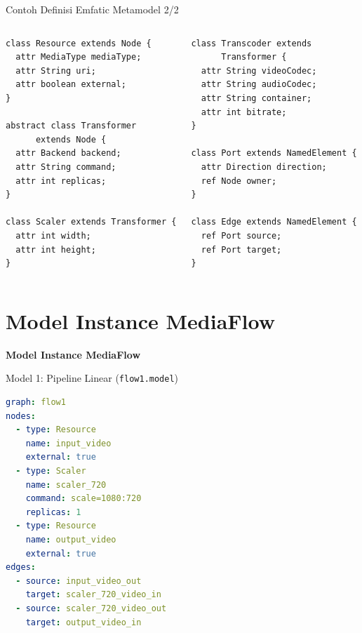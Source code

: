 \documentclass[aspectratio=169, table]{beamer}
\begin{document}
\begin{frame}[fragile]{Contoh Definisi Emfatic Metamodel 2/2}
\vspace{20pt}
\begin{columns}[T]


\begin{lstlisting}[language=emfatic, basicstyle=\ttfamily\scriptsize, firstnumber=35]
class Resource extends Node {
  attr MediaType mediaType;
  attr String uri;
  attr boolean external;
}

abstract class Transformer
      extends Node {
  attr Backend backend;
  attr String command;
  attr int replicas;
}

class Scaler extends Transformer {
  attr int width;
  attr int height;
}
\end{lstlisting}


\begin{lstlisting}[language=emfatic, basicstyle=\ttfamily\scriptsize, firstnumber=51]
class Transcoder extends
      Transformer {
  attr String videoCodec;
  attr String audioCodec;
  attr String container;
  attr int bitrate;
}

class Port extends NamedElement {
  attr Direction direction;
  ref Node owner;
}

class Edge extends NamedElement {
  ref Port source;
  ref Port target;
}
\end{lstlisting}

\end{columns}

\end{frame}

\section{Model Instance MediaFlow}
\begin{frame}{\hfill}
	\centering
	\Huge{\textbf{Model Instance MediaFlow}}
\end{frame}

\begin{frame}[fragile]{Model 1: Pipeline Linear (\texttt{flow1.model})}
\vspace{4pt}
\begin{lstlisting}[language=yaml]
graph: flow1
nodes:
  - type: Resource
    name: input_video
    external: true
  - type: Scaler
    name: scaler_720
    command: scale=1080:720
    replicas: 1
  - type: Resource
    name: output_video
    external: true
edges:
  - source: input_video_out
    target: scaler_720_video_in
  - source: scaler_720_video_out
    target: output_video_in
\end{lstlisting}
\end{frame}
\end{document}
